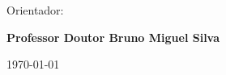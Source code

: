 \vspace{0,5cm}
\begin{center}
  \begin{normalsize}
    \begin{large}
      Orientador:
    \end{large}
  \end{normalsize}
\end{center}

\vspace{0.2cm}
\begin{center}
  \begin{large}
    \textbf{Professor Doutor Bruno Miguel Silva}
  \end{large}
\end{center}



\vspace{0.5cm}
\begin{center}
  \begin{normalsize}
    \today
  \end{normalsize}
\end{center}

